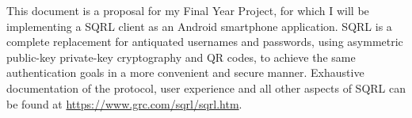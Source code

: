 This document is a proposal for my Final Year Project, for which I will be implementing a SQRL client as an Android smartphone application. SQRL is a complete replacement for antiquated usernames and passwords, using asymmetric public-key private-key cryptography and QR codes, to achieve the same authentication goals in a more convenient and secure manner. Exhaustive documentation of the protocol, user experience and all other aspects of SQRL can be found at \url{https://www.grc.com/sqrl/sqrl.htm}.

